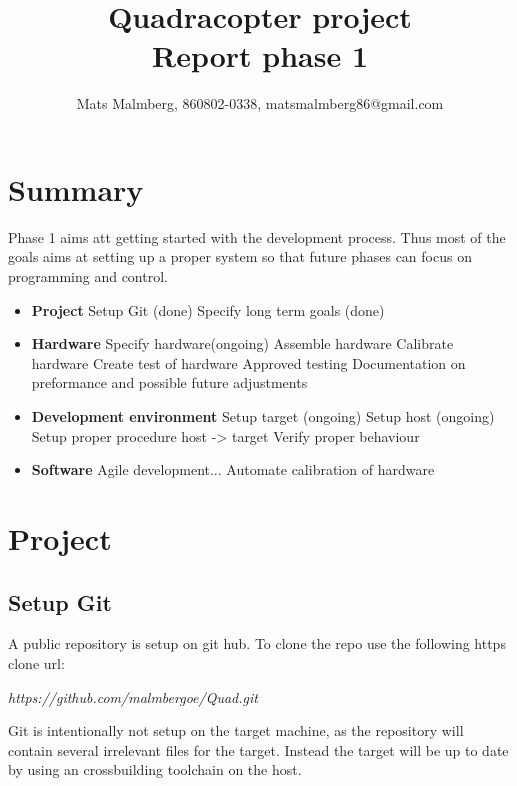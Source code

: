 \documentclass[12pt]{article}
\title{\center Quadracopter project\\ Report phase 1}			%
\author{ Mats Malmberg, 860802-0338, matsmalmberg86@gmail.com}
\begin{document}
\maketitle			%

\section{Summary}
Phase 1 aims att getting started with the development process. Thus most of the goals aims at setting up a proper system so that future phases can focus on programming and control. 
\begin{itemize}
\item[] \textbf{Project}
	\subitem{-} Setup Git (done)
	\subitem{-} Specify long term goals (done)
	
\item[] \textbf{Hardware}
	\subitem{-} Specify hardware(ongoing)
	\subitem{-} Assemble hardware
	\subitem{-} Calibrate hardware
	\subitem{-} Create test of hardware
	\subitem{-} Approved testing
	\subitem{-} Documentation on preformance and possible future adjustments

\item[] \textbf{Development environment}
	\subitem{-} Setup target (ongoing)
	\subitem{-} Setup host (ongoing)
	\subitem{-} Setup proper procedure host -> target
	\subitem{-} Verify proper behaviour

\item[] \textbf{Software}
	\subitem{-} Agile development...
	\subitem{-} Automate calibration of hardware
\end{itemize}

\section{Project}
	\subsection{Setup Git}
	A public repository is setup on git hub. To clone the repo use the following 
	https clone url:
	\begin{codebox}
		\emph{https://github.com/malmbergoe/Quad.git}
	\end{codebox}
	Git is intentionally not setup on the target machine, as the repository will contain several irrelevant files for the target. Instead the target will be up to date by using an crossbuilding toolchain on the host.
\end{document}

